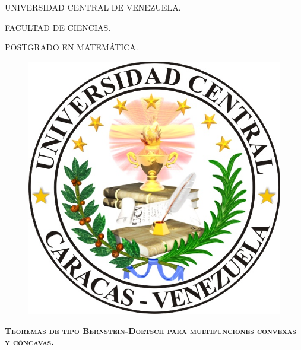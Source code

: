 
\begin{titlepage}
%


\begin{center}

UNIVERSIDAD CENTRAL DE VENEZUELA.

FACULTAD DE CIENCIAS.

POSTGRADO EN MATEM\'ATICA.

\end{center}

\begin{figure}[h]
	\centering
		\includegraphics[scale=0.3]{ucv.jpg}
\end{figure}


\vspace{1cm}

\begin{large}

\begin{center}

\parbox{12cm}{
\begin{center} 
\textsc{\textbf{Teoremas de tipo Bernstein-Doetsch para
								multifunciones convexas y c\'oncavas.}}
\end{center}
}
\end{center}


\end{large}
\end{titlepage}
